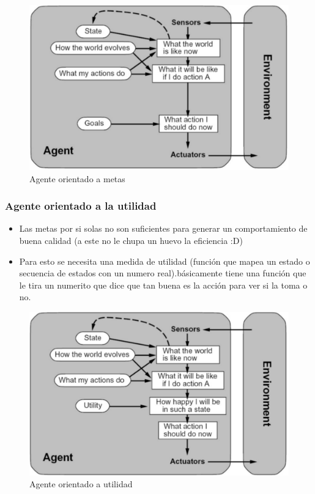 \begin{figure}
  \centering
  \includegraphics[width=16cm, scale=1]{Images/Imagenes/AgenteOrientadoAMetas.png}
  \caption{Agente orientado a metas}
\end{figure}

\subsubsection*{Agente orientado a la utilidad}
\begin{itemize}
  \item Las metas por si solas no son suficientes para generar un comportamiento de buena calidad (a este no le chupa un huevo la eficiencia :D)
  \item Para esto se necesita una medida de utilidad (función que mapea un estado o secuencia de estados con un numero real).básicamente tiene una función que le tira un numerito que dice que tan buena es la acción para ver si la toma o no.
\end{itemize}

\begin{figure}
  \centering
  \includegraphics[width=16cm, scale=1]{Images/Imagenes/AgenteOrientadoAutilidad.png}
  \caption{Agente orientado a utilidad}
\end{figure}

